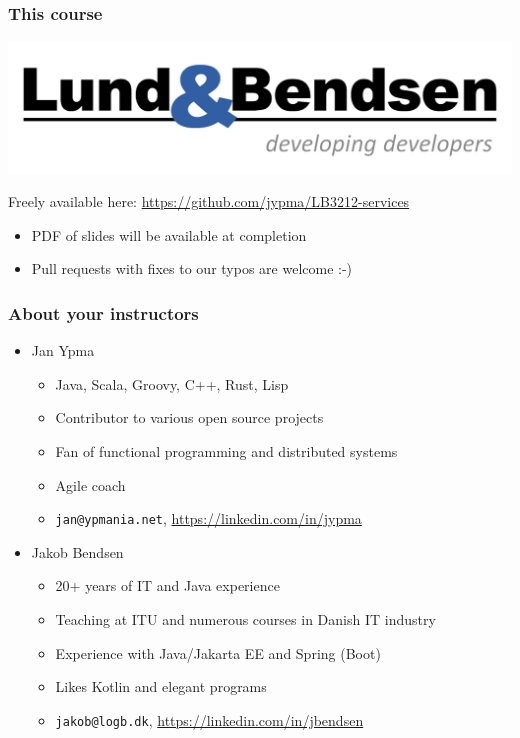 \documentclass[8pt]{article}
\begin{document}
\subsubsection{This course}
\label{sec:orgd867615}


\begin{center}
\includegraphics[width=.9\linewidth]{graphics/lb-logo_stort_1363x359.jpg}
\end{center}

Freely available here:
\href{https://github.com/jypma/LB3212-services}{https://github.com/jypma/LB3212-services}

\begin{itemize}
\item PDF of slides will be available at completion
\item Pull requests with fixes to our typos are welcome :-)
\end{itemize}

\subsubsection{About your instructors}
\label{sec:org4d49eeb}
\begin{itemize}
\item Jan Ypma
\begin{itemize}
\item Java, Scala, Groovy, C++, Rust, Lisp
\item Contributor to various open source projects
\item Fan of functional programming and distributed systems
\item Agile coach
\item \texttt{jan@ypmania.net}, \url{https://linkedin.com/in/jypma}
\end{itemize}

\item Jakob Bendsen
\begin{itemize}
\item 20+ years of IT and Java experience
\item Teaching at ITU and numerous courses in Danish IT industry
\item Experience with Java/Jakarta EE and Spring (Boot)
\item Likes Kotlin and elegant programs
\item \texttt{jakob@logb.dk}, \url{https://linkedin.com/in/jbendsen}
\end{itemize}
\end{itemize}
\end{document}

